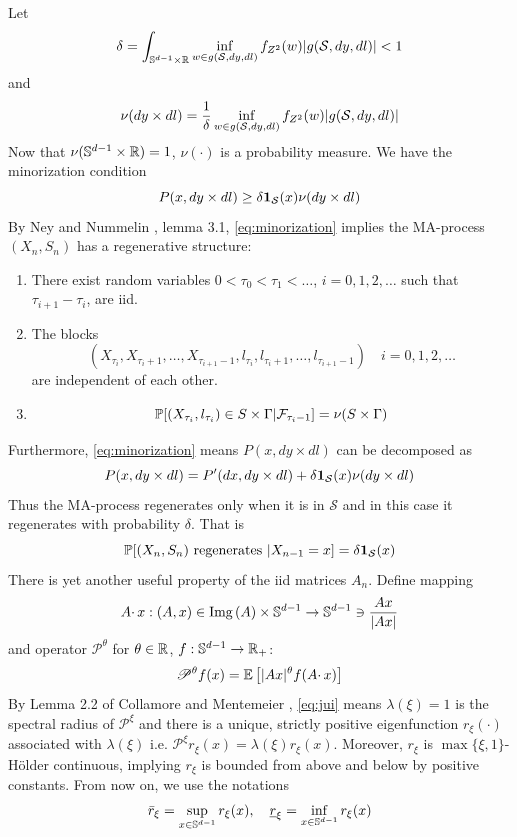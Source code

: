 Let
\[
\delta = \int_{\sphere^{d-1} \times \reals}
\inf_{w \in g(\mathcal S, dy, dl)} f_{Z^2}(w)
| g(\mathcal S, dy, dl)| < 1
\]
and
\[
\nu(dy \times dl) = {1 \over \delta}
\inf_{w \in g(\mathcal S, dy, dl)} f_{Z^2}(w)
| g(\mathcal S, dy, dl)|
\]
Now that $\nu(\sphere^{d-1} \times \reals) = 1$, $\nu(\cdot)$ is a
probability measure. We have the minorization condition
\begin{equation}
  \label{eq:minorization}
  P(x, dy \times dl) \geq \delta \I_{\mathcal S}(x) \nu(dy \times dl)
\end{equation}
By Ney and Nummelin \cite{ney:nummelin:1987}, lemma 3.1,
\eqref{eq:minorization} implies the MA-process $(X_n, S_n)$ has a
regenerative structure:
\begin{enumerate}[(1)]
\item There exist random variables $0 < \tau_0 < \tau_1 < \dots$,
  $i = 0, 1, 2, \dots$ such that $\tau_{i+1} - \tau_i$,  are iid.
\item The blocks
  \[
  (X_{\tau_i}, X_{\tau_i + 1}, \dots, X_{\tau_{i+1} - 1}, l_{\tau_i},
  l_{\tau_i + 1}, \dots, l_{\tau_{i+1} - 1}) \quad
  i = 0, 1, 2, \dots
  \]
  are independent of each other.
\item
  \[
  \P[(X_{\tau_i}, l_{\tau_i}) \in S \times \Gamma | \mathcal F_{\tau_i - 1}]
  = \nu(S \times \Gamma)
  \]
\end{enumerate}
Furthermore, \eqref{eq:minorization} means
$P(x, dy \times dl)$ can be decomposed as
\[
P(x, dy \times dl) = P'(dx, dy \times dl)
+
\delta \I_{\mathcal S}(x) \nu(dy \times dl)
\]
Thus the MA-process regenerates only when it is in $\mathcal S$ and in
this case it regenerates with probability $\delta$. That is
\[
\P[(X_n, S_n) \text{ regenerates } | X_{n-1} = x] = \delta \I_{\mathcal S}(x)
\]
There is yet another useful property of the iid matrices $A_n$. Define
mapping
\[
A \cdotp x: (A, x) \in \img(A) \times \sphere^{d-1} \to
\sphere^{d-1} \ni {
  A x \over |A x|
}
\]
and operator $\mathscr P^\theta$ for $\theta \in \reals$,
$f: \sphere^{d-1} \to \reals_+$:
\begin{equation}
  \label{eq:trhyh}
  \mathscr P^\theta f(x) =
  \E \left[
    |A x|^\theta f(A \cdotp x)
    \right]
\end{equation}
By Lemma 2.2 of Collamore and Mentemeier
\cite{collamore:mentemeier:2016}, \eqref{eq:jui} means
$\lambda(\xi) = 1$ is the spectral radius of $\mathscr P^\xi$ and
there is a unique, strictly positive eigenfunction $r_\xi(\cdot)$
associated with $\lambda(\xi)$ i.e.
$\mathscr P^\xi r_\xi(x) = \lambda(\xi) r_\xi(x)$.
Moreover, $r_\xi$ is $\max\{\xi, 1\}$-H\"older continuous, implying
$r_\xi$ is bounded from above and below by positive constants. From
now on, we use the notations
\[
\bar r_\xi = \sup_{x \in \sphere^{d-1}} r_\xi(x),\quad
\underline r_\xi = \inf_{x \in \sphere^{d-1}} r_\xi(x)
\]

